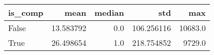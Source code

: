 \begin{tabular}{lrrrr}
\toprule
 is\_comp &       mean &  median &         std &      max \\
\midrule
   False &  13.583792 &     0.0 &  106.256116 &  10683.0 \\
    True &  26.498654 &     1.0 &  218.754852 &   9729.0 \\
\bottomrule
\end{tabular}
